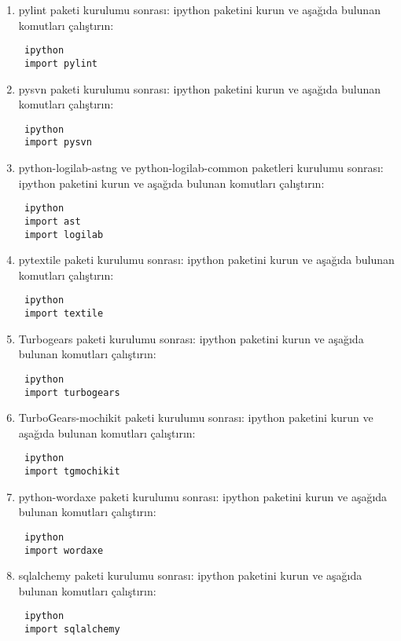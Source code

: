 \documentclass[a4paper,10pt]{article}
\begin{document}
\begin{enumerate}
\item pylint  paketi kurulumu sonrası:
ipython paketini kurun ve aşağıda bulunan komutları çalıştırın:
\begin{verbatim}
 ipython
 import pylint
\end{verbatim}

\item pysvn  paketi kurulumu sonrası:
ipython paketini kurun ve aşağıda bulunan komutları çalıştırın:
\begin{verbatim}
 ipython
 import pysvn
\end{verbatim}

\item python-logilab-astng ve python-logilab-common  paketleri kurulumu sonrası:
ipython paketini kurun ve aşağıda bulunan komutları çalıştırın:
\begin{verbatim}
 ipython
 import ast
 import logilab
\end{verbatim}


\item pytextile  paketi kurulumu sonrası:
ipython paketini kurun ve aşağıda bulunan komutları çalıştırın:
\begin{verbatim}
 ipython
 import textile
\end{verbatim}

\item Turbogears  paketi kurulumu sonrası:
ipython paketini kurun ve aşağıda bulunan komutları çalıştırın:
\begin{verbatim}
 ipython
 import turbogears
\end{verbatim}

\item TurboGears-mochikit  paketi kurulumu sonrası:
ipython paketini kurun ve aşağıda bulunan komutları çalıştırın:
\begin{verbatim}
 ipython
 import tgmochikit
\end{verbatim}


\item python-wordaxe paketi kurulumu sonrası:
ipython paketini kurun ve aşağıda bulunan komutları çalıştırın:
\begin{verbatim}
 ipython
 import wordaxe
\end{verbatim}


\item sqlalchemy paketi kurulumu sonrası:
ipython paketini kurun ve aşağıda bulunan komutları çalıştırın:
\begin{verbatim}
 ipython
 import sqlalchemy
\end{verbatim}



\end{enumerate}
\end{document}
